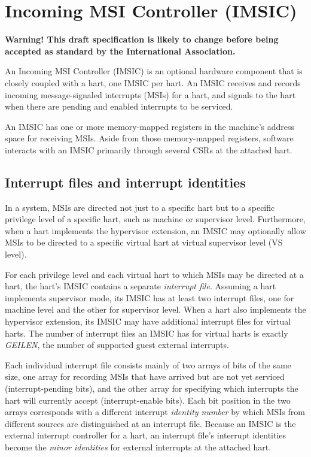 
\chapter{Incoming MSI Controller (IMSIC)}
\label{ch:IMSIC}

\textbf{%
Warning!
This draft specification is likely to change before being accepted as
standard by the {\RISCV} International Association.%
}
\bigskip

An Incoming MSI Controller (IMSIC) is an optional {\RISCV} hardware
component that is closely coupled with a hart, one IMSIC per hart.
An IMSIC receives and records incoming message-signaled interrupts
(MSIs) for a hart, and signals to the hart when there are pending and
enabled interrupts to be serviced.

An IMSIC has one or more memory-mapped registers in the machine's
address space for receiving MSIs.
Aside from those memory-mapped registers, software interacts with an
IMSIC primarily through several {\RISCV} CSRs at the attached hart.

\section{Interrupt files and interrupt identities}
\label{sec:IMSIC-intrFilesAndIdents}

In a {\RISCV} system, MSIs are directed not just to a specific hart but
to a specific privilege level of a specific hart, such as machine or
supervisor level.
Furthermore, when a hart implements the hypervisor extension, an IMSIC
may optionally allow MSIs to be directed to a specific virtual hart at
virtual supervisor level (VS level).

For each privilege level and each virtual hart to which MSIs
may be directed at a hart, the hart's IMSIC contains a separate
\emph{interrupt file}.
Assuming a hart implements supervisor mode, its IMSIC has at least two
interrupt files, one for machine level and the other for supervisor
level.
When a hart also implements the hypervisor extension, its IMSIC may
have additional interrupt files for virtual harts.
The number of interrupt files an IMSIC has for virtual harts is exactly
\emph{GEILEN}, the number of supported guest external interrupts.

Each individual interrupt file consists mainly of two arrays of bits
of the same size, one array for recording MSIs that have arrived but
are not yet serviced (interrupt-pending bits), and the other array
for specifying which interrupts the hart will currently accept
(interrupt-enable bits).
Each bit position in the two arrays corresponds with a different
interrupt \emph{identity number} by which MSIs from different sources
are distinguished at an interrupt file.
Because an IMSIC is the external interrupt controller for
a hart, an interrupt file's interrupt identities become the
\emph{minor identities} for external interrupts at the attached hart.

